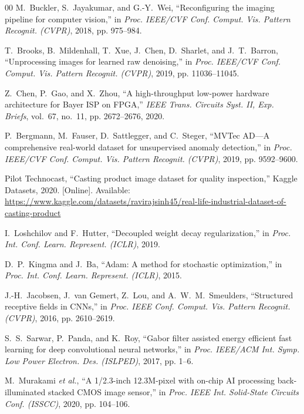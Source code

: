 \documentclass[conference]{IEEEtran}
\begin{document}
\begin{thebibliography}{00}
M.~Buckler, S.~Jayakumar, and G.-Y.~Wei, ``Reconfiguring the imaging pipeline for computer vision,'' in \emph{Proc. IEEE/CVF Conf. Comput. Vis. Pattern Recognit. (CVPR)}, 2018, pp. 975--984.

T.~Brooks, B.~Mildenhall, T.~Xue, J.~Chen, D.~Sharlet, and J.~T.~Barron, ``Unprocessing images for learned raw denoising,'' in \emph{Proc. IEEE/CVF Conf. Comput. Vis. Pattern Recognit. (CVPR)}, 2019, pp. 11036--11045.

Z.~Chen, P.~Gao, and X.~Zhou, ``A high-throughput low-power hardware architecture for {Bayer} {ISP} on {FPGA},'' \emph{IEEE Trans. Circuits Syst. II, Exp. Briefs}, vol.~67, no.~11, pp. 2672--2676, 2020.

P.~Bergmann, M.~Fauser, D.~Sattlegger, and C.~Steger, ``{MVTec AD}---A comprehensive real-world dataset for unsupervised anomaly detection,'' in \emph{Proc. IEEE/CVF Conf. Comput. Vis. Pattern Recognit. (CVPR)}, 2019, pp. 9592--9600.

Pilot Technocast, ``Casting product image dataset for quality inspection,'' Kaggle Datasets, 2020. [Online]. Available: \url{https://www.kaggle.com/datasets/ravirajsinh45/real-life-industrial-dataset-of-casting-product}

I.~Loshchilov and F.~Hutter, ``Decoupled weight decay regularization,'' in \emph{Proc. Int. Conf. Learn. Represent. (ICLR)}, 2019.

D.~P.~Kingma and J.~Ba, ``Adam: A method for stochastic optimization,'' in \emph{Proc. Int. Conf. Learn. Represent. (ICLR)}, 2015.

J.-H.~Jacobsen, J.~van Gemert, Z.~Lou, and A.~W.~M.~Smeulders, ``Structured receptive fields in {CNNs},'' in \emph{Proc. IEEE Conf. Comput. Vis. Pattern Recognit. (CVPR)}, 2016, pp. 2610--2619.

S.~S.~Sarwar, P.~Panda, and K.~Roy, ``{Gabor} filter assisted energy efficient fast learning for deep convolutional neural networks,'' in \emph{Proc. IEEE/ACM Int. Symp. Low Power Electron. Des. (ISLPED)}, 2017, pp. 1--6.

M.~Murakami \emph{et al.}, ``A 1/2.3-inch 12.3{M}-pixel with on-chip {AI} processing back-illuminated stacked {CMOS} image sensor,'' in \emph{Proc. IEEE Int. Solid-State Circuits Conf. (ISSCC)}, 2020, pp. 104--106.


\end{thebibliography}
\end{document}
